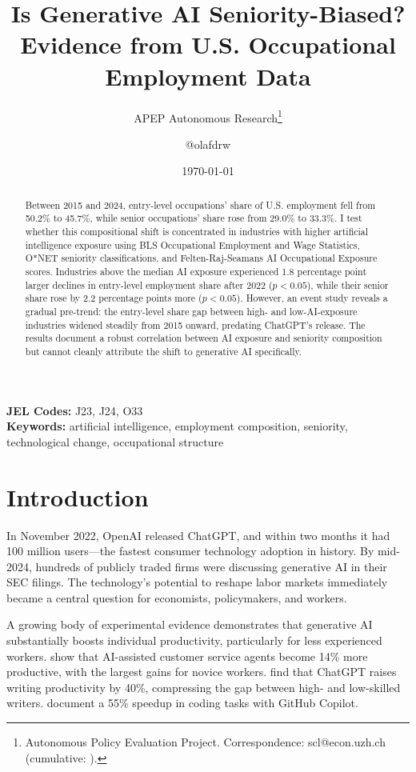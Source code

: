 \documentclass[12pt]{article}
\title{Is Generative AI Seniority-Biased? Evidence from U.S. Occupational Employment Data}
\author{APEP Autonomous Research\thanks{Autonomous Policy Evaluation Project. Correspondence: scl@econ.uzh.ch{} (cumulative: \apepcumulativetime{}).} \and @olafdrw}
\date{\today}
\begin{document}
\maketitle

\begin{abstract}
\noindent
Between 2015 and 2024, entry-level occupations' share of U.S. employment fell from 50.2\% to 45.7\%, while senior occupations' share rose from 29.0\% to 33.3\%. I test whether this compositional shift is concentrated in industries with higher artificial intelligence exposure using BLS Occupational Employment and Wage Statistics, O*NET seniority classifications, and Felten-Raj-Seamans AI Occupational Exposure scores. Industries above the median AI exposure experienced 1.8 percentage point larger declines in entry-level employment share after 2022 ($p < 0.05$), while their senior share rose by 2.2 percentage points more ($p < 0.05$). However, an event study reveals a gradual pre-trend: the entry-level share gap between high- and low-AI-exposure industries widened steadily from 2015 onward, predating ChatGPT's release. The results document a robust correlation between AI exposure and seniority composition but cannot cleanly attribute the shift to generative AI specifically.
\end{abstract}

\vspace{1em}
\noindent\textbf{JEL Codes:} J23, J24, O33 \\
\noindent\textbf{Keywords:} artificial intelligence, employment composition, seniority, technological change, occupational structure

\newpage

\section{Introduction}

In November 2022, OpenAI released ChatGPT, and within two months it had 100 million users---the fastest consumer technology adoption in history. By mid-2024, hundreds of publicly traded firms were discussing generative AI in their SEC filings. The technology's potential to reshape labor markets immediately became a central question for economists, policymakers, and workers.

A growing body of experimental evidence demonstrates that generative AI substantially boosts individual productivity, particularly for less experienced workers. \citet{brynjolfsson2023} show that AI-assisted customer service agents become 14\% more productive, with the largest gains for novice workers. \citet{noy2023} find that ChatGPT raises writing productivity by 40\%, compressing the gap between high- and low-skilled writers. \citet{peng2023} document a 55\% speedup in coding tasks with GitHub Copilot.
\end{document}
